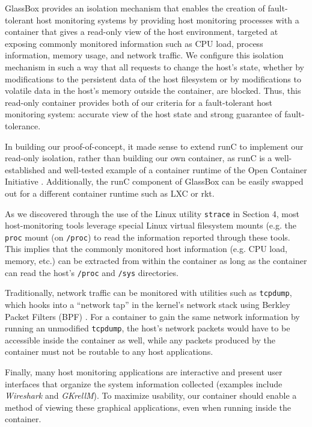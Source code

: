\documentclass{proc}
\begin{document}
GlassBox provides an isolation mechanism that enables the creation of fault-tolerant host monitoring systems by providing host monitoring processes with a container that gives a read-only view of the host environment, targeted at exposing commonly monitored information such as CPU load, process information, memory usage, and network traffic. We configure this isolation mechanism in such a way that all requests to change the host's state, whether by modifications to the persistent data of the host filesystem or by modifications to volatile data in the host's memory outside the container, are blocked. Thus, this read-only container provides both of our criteria for a fault-tolerant host monitoring system: accurate view of the host state and strong guarantee of fault-tolerance.

In building our proof-of-concept, it made sense to extend runC to implement our read-only isolation, rather than building our own container, as runC is a well-established and well-tested example of a container runtime of the Open Container Initiative \cite{opencontainerinitiative}. Additionally, the runC component of GlassBox can be easily swapped out for a different container runtime such as LXC or rkt.

As we discovered through the use of the Linux utility \texttt{strace} in Section 4, most host-monitoring tools leverage special Linux virtual filesystem mounts (e.g. the \texttt{proc} mount (on \texttt{/proc}) to read the information reported through these tools. This implies that the commonly monitored host information (e.g. CPU load, memory, etc.) can be extracted from within the container as long as the container can read the host's \texttt{/proc} and \texttt{/sys} directories.

Traditionally, network traffic can be monitored with utilities such as \texttt{tcpdump}, which hooks into a ``network tap'' in the kernel's network stack using Berkley Packet Filters (BPF) \cite{bsdpacketfilter}. For a container to gain the same network information by running an unmodified \texttt{tcpdump}, the host's network packets would have to be accessible inside the container as well, while any packets produced by the container must not be routable to any host applications.

Finally, many host monitoring applications are interactive and present user interfaces that organize the system information collected (examples include \textit{Wireshark} and \textit{GKrellM}). To maximize usability, our container should enable a method of viewing these graphical applications, even when running inside the container.
\end{document}
